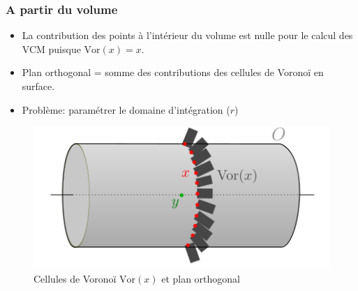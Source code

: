 \documentclass{beamer}
\begin{document}
\begin{frame}
	\frametitle{A partir du volume}
	\begin{itemize}
		
		\item La contribution des points à l'intérieur du volume est nulle pour le calcul des VCM puisque $\text{Vor}(x) = x$.
		\item Plan orthogonal = somme des contributions des cellules de Voronoï en surface.
		\item Problème: paramétrer le domaine d'intégration ($r$)
	\end{itemize}
	\begin{figure}
		\includegraphics[clip, trim=0 0cm 0 3 cm, scale=0.35]{fig/cylindercone.png}
		\caption{Cellules de Voronoï $\text{Vor}(x)$ et plan orthogonal}
	\end{figure}
\end{frame}
\end{document}
